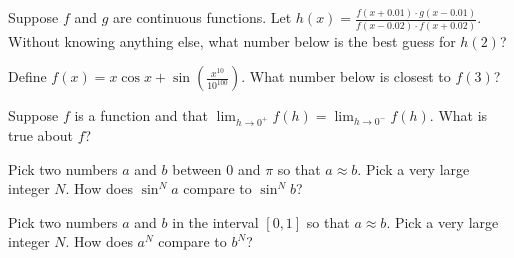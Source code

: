 \documentclass{ximera}
\newcommand{\recommendation}[1]{}
\begin{document}
\begin{problem}
  Suppose $f$ and $g$ are continuous functions.  Let $h(x) = \frac{f(x+0.01) \cdot g(x - 0.01)}{f(x-0.02) \cdot f(x + 0.02)}$.  Without knowing anything else, what number below is the best guess for $h(2)$?
  \begin{multipleChoice}
  \end{multipleChoice}
\end{problem}

\begin{problem}
  Define $f(x) = x \cos x + \sin\left(\frac{x^{10}}{10^{100}}\right)$.  What number below is closest to $f(3)$?
  \begin{multipleChoice}
  \end{multipleChoice}
\end{problem}

\begin{problem}

\recommendation{Vic}
  Suppose $f$ is a function and that $\lim_{h \to 0^{+}} f(h) = \lim_{h \to 0^{-}} f(h)$.  What is true about $f$?
  \begin{multipleChoice}
  \end{multipleChoice}
\end{problem}

\begin{problem}
  Pick two numbers $a$ and $b$ between $0$ and $\pi$ so that
  $a \approx b$.  Pick a very large integer $N$.  How does $\sin^N a$
  compare to $\sin^N b$?
  \begin{multipleChoice}
  \end{multipleChoice}
\end{problem}

\begin{problem} 
  Pick two numbers $a$ and $b$ in the interval $[0,1]$ so that
  $a \approx b$.  Pick a very large integer $N$.  How does $a^N$
  compare to $b^N$?
  \begin{multipleChoice}
  \end{multipleChoice}
\end{problem}
\end{document}

